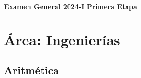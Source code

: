 \clearpage
\thispagestyle{empty}

\vspace*{\fill}
\begin{center}
	{\Huge\bfseries Examen General 2024-I Primera Etapa}
\end{center}
\vspace*{\fill}

\clearpage




\section*{Área: Ingenierías}


\subsection*{Aritmética}

